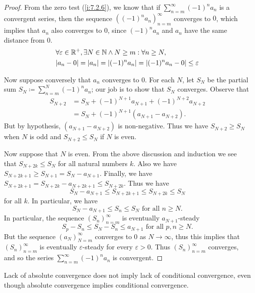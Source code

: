 \begin{proof}
  From the zero test (\cref{i:7.2.6}), we know that if \(\sum_{n = m}^\infty (-1)^n a_n\) is a convergent series, then the sequence \(((-1)^n a_n)_{n = m}^\infty\) converges to \(0\), which implies that \(a_n\) also converges to \(0\), since \((-1)^n a_n\) and \(a_n\) have the same distance from \(0\).
  \begin{align*}
     & \forall \varepsilon \in \R^+, \exists N \in \N \land N \geq m : \forall n \geq N,    \\
     & \abs{a_n - 0} = \abs{a_n} = \abs{(-1)^n a_n} = \abs{(-1)^n a_n - 0} \leq \varepsilon
  \end{align*}

  Now suppose conversely that \(a_n\) converges to \(0\).
  For each \(N\), let \(S_N\) be the partial sum \(S_N \coloneqq \sum_{n = m}^N (-1)^n a_n\);
  our job is to show that \(S_N\) converges.
  Observe that
  \begin{align*}
    S_{N + 2} & = S_N + (-1)^{N + 1} a_{N + 1} + (-1)^{N + 2} a_{N + 2} \\
              & = S_N + (-1)^{N + 1} (a_{N + 1} - a_{N + 2}).
  \end{align*}
  But by hypothesis, \((a_{N + 1} - a_{N + 2})\) is non-negative.
  Thus we have \(S_{N + 2} \geq S_N\) when \(N\) is odd and \(S_{N + 2} \leq S_N\) if \(N\) is even.

  Now suppose that \(N\) is even.
  From the above discussion and induction we see that \(S_{N + 2k} \leq S_N\) for all natural numbers \(k\).
  Also we have \(S_{N + 2k + 1} \geq S_{N + 1} = S_N - a_{N + 1}\).
  Finally, we have \(S_{N + 2k + 1} = S_{N + 2k} - a_{N + 2k + 1} \leq S_{N + 2k}\).
  Thus we have
  \[
    S_N - a_{N + 1} \leq S_{N + 2k + 1} \leq S_{N + 2k} \leq S_N
  \]
  for all \(k\).
  In particular, we have
  \[
    S_N - a_{N + 1} \leq S_n \leq S_N \text{ for all } n \geq N.
  \]
  In particular, the sequence \((S_n)_{n = m}^\infty\) is eventually \(a_{N + 1}\)-steady
  \[
    S_p - S_n \leq S_N - S_n \leq a_{N + 1} \text{ for all } p, n \geq N.
  \]
  But the sequence \((a_N)_{N = m}^\infty\) converges to \(0\) as \(N \to \infty\), thus this implies that \((S_n)_{n = m}^\infty\) is eventually \(\varepsilon\)-steady for every \(\varepsilon > 0\).
  Thus \((S_n)_{n = m}^\infty\) converges, and so the series \(\sum_{n = m}^\infty (-1)^n a_n\) is convergent.
\end{proof}

\begin{note}
  Lack of absolute convergence does not imply lack of conditional convergence, even though absolute convergence implies conditional convergence.
\end{note}

